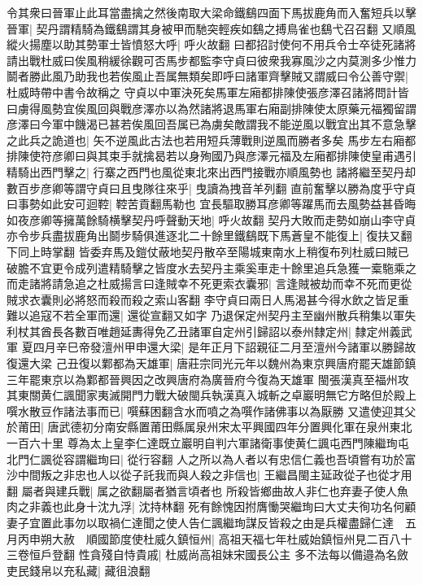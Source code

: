 令其衆曰晉軍止此耳當盡擒之然後南取大梁命鐵鷂四面下馬拔鹿角而入奮短兵以擊晉軍|{
	契丹謂精騎為鐵鷂謂其身被甲而馳突輕疾如鷂之搏鳥雀也鷂弋召召翻}
又順風縱火揚塵以助其勢軍士皆憤怒大呼|{
	呼火故翻}
曰都招討使何不用兵令士卒徒死諸將請出戰杜威曰俟風稍緩徐觀可否馬步都監李守貞曰彼衆我寡風沙之内莫測多少惟力鬬者勝此風乃助我也若俟風止吾属無類矣即呼曰諸軍齊擊賊又謂威曰令公善守禦|{
	杜威時帶中書令故稱之}
守貞以中軍決死矣馬軍左廂都排陳使張彦澤召諸將問計皆曰虜得風勢宜俟風回與戰彦澤亦以為然諸將退馬軍右廂副排陳使太原藥元福獨留謂彦澤曰今軍中饑渴已甚若俟風回吾属已為虜矣敵謂我不能逆風以戰宜出其不意急擊之此兵之詭道也|{
	矢不逆風此古法也若用短兵薄戰則逆風而勝者多矣}
馬步左右廂都排陳使符彦卿曰與其束手就擒曷若以身殉國乃與彦澤元福及左廂都排陳使皇甫遇引精騎出西門擊之|{
	行寨之西門也風從東北來出西門接戰亦順風勢也}
諸將繼至契丹却數百步彦卿等謂守貞曰且曳隊往來乎|{
	曳讀為拽音羊列翻}
直前奮擊以勝為度乎守貞曰事勢如此安可迴鞚|{
	鞚苦貢翻馬勒也}
宜長驅取勝耳彦卿等躍馬而去風勢益甚昏晦如夜彦卿等擁萬餘騎横擊契丹呼聲動天地|{
	呼火故翻}
契丹大敗而走勢如崩山李守貞亦令步兵盡拔鹿角出鬬步騎俱進逐北二十餘里鐵鷂既下馬蒼皇不能復上|{
	復扶又翻下同上時掌翻}
皆委弃馬及鎧仗蔽地契丹散卒至陽城東南水上稍復布列杜威曰賊已破膽不宜更令成列遣精騎擊之皆度水去契丹主乘奚車走十餘里追兵急獲一槖駞乘之而走諸將請急追之杜威揚言曰逢賊幸不死更索衣囊邪|{
	言逢賊被劫而幸不死而更從賊求衣囊則必將怒而殺而殺之索山客翻}
李守貞曰兩日人馬渴甚今得水飲之皆足重難以追寇不若全軍而還|{
	還從宣翻又如字}
乃退保定州契丹主至幽州散兵稍集以軍失利杖其酋長各數百唯趙延夀得免乙丑諸軍自定州引歸詔以泰州隸定州|{
	隸定州義武軍}
夏四月辛巳帝發澶州甲申還大梁|{
	是年正月下詔親征二月至澶州今諸軍以勝歸故復還大梁}
己丑復以鄴都為天雄軍|{
	唐莊宗同光元年以魏州為東京興唐府罷天雄節鎮三年罷東京以為鄴都晉興因之改興唐府為廣晉府今復為天雄軍}
閩張漢真至福州攻其東關黄仁諷聞家夷滅開門力戰大破閩兵執漢真入城斬之卓巖明無它方略但於殿上噀水散豆作諸法事而已|{
	噀蘇困翻含水而噴之為噀作諸佛事以為厭勝}
又遣使迎其父於莆田|{
	唐武德初分南安縣置莆田縣属泉州宋太平興國四年分置興化軍在泉州東北一百六十里}
尊為太上皇李仁達既立巖明自判六軍諸衛事使黄仁諷屯西門陳繼珣屯北門仁諷從容謂繼珣曰|{
	從行容翻}
人之所以為人者以有忠信仁義也吾頃嘗有功於富沙中間叛之非忠也人以從子託我而與人殺之非信也|{
	王繼昌閩主延政從子也從才用翻}
屬者與建兵戰|{
	属之欲翻屬者猶言頃者也}
所殺皆鄉曲故人非仁也弃妻子使人魚肉之非義也此身十沈九浮|{
	沈持林翻}
死有餘愧因拊膺慟哭繼珣曰大丈夫徇功名何顧妻子宜置此事勿以取禍仁達聞之使人告仁諷繼珣謀反皆殺之由是兵權盡歸仁達　五月丙申朔大赦　順國節度使杜威久鎮恒州|{
	高祖天福七年杜威始鎮恒州見二百八十三卷恒戶登翻}
性貪殘自恃貴戚|{
	杜威尚高祖妹宋國長公主}
多不法每以備邉為名斂吏民錢帛以充私藏|{
	藏徂浪翻}
